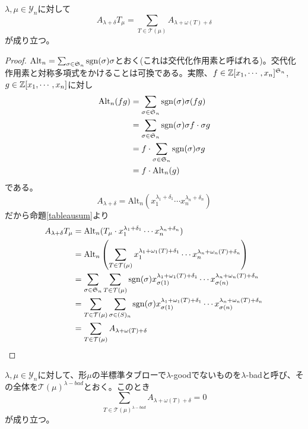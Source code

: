 \documentclass{ltjsreport}
\begin{document}
\begin{lemm}\label{equality}
    $\lambda,\mu\in\mathcal{Y}_n$に対して
    \[
    A_{\lambda+\delta}T_\mu=\sum_{T\in\mathcal{T}(\mu)}A_{\lambda+\omega(T)+\delta}
    \]
    が成り立つ。
\end{lemm}

\begin{proof}
    $\text{Alt}_n=\sum_{\sigma\in\mathfrak{S}_n}\mathrm{sgn}(\sigma)\sigma$とおく(これは交代化作用素と呼ばれる)。交代化作用素と対称多項式をかけることは可換である。実際、$f\in\mathbb{Z}[x_1,\cdots,x_n]^{\mathfrak{S}_n}$, $g\in\mathbb{Z}[x_1,\cdots,x_n]$に対し
    \begin{align*}
        \text{Alt}_n(fg)&=\sum_{\sigma\in\mathfrak{S}_n}\mathrm{sgn}(\sigma)\sigma(fg)\\
        &=\sum_{\sigma\in\mathfrak{S}_n}\mathrm{sgn}(\sigma)\sigma f\cdot \sigma g\\
        &=f\cdot\sum_{\sigma\in\mathfrak{S}_n}\mathrm{sgn}(\sigma)\sigma g\\
        &=f\cdot\text{Alt}_n(g)
    \end{align*}
    である。
    \[
    A_{\lambda+\delta}=\text{Alt}_n(x_1^{\lambda_1+\delta_1}\cdots x_n^{\lambda_n+\delta_n})
    \]
    だから命題\ref{tableausum}より
    \begin{align*}
        A_{\lambda+\delta}T_\mu&=\text{Alt}_n(T_\mu\cdot x_1^{\lambda_1+\delta_1}\cdots x_n^{\lambda_n+\delta_n})\\
        &=\text{Alt}_n\left(
            \sum_{T\in\mathcal{T}(\mu)}x_1^{\lambda_1+\omega_1(T)+\delta_1}\cdots x_n^{\lambda_n+\omega_n(T)+\delta_n}
        \right)\\
        &=\sum_{\sigma\in\mathfrak{S}_n}\sum_{T\in\mathcal{T}(\mu)}\mathrm{sgn}(\sigma)x_{\sigma(1)}^{\lambda_1+\omega_1(T)+\delta_1}\cdots x_{\sigma(n)}^{\lambda_n+\omega_n(T)+\delta_n}\\
        &=\sum_{T\in\mathcal{T}(\mu)}\sum_{\sigma\in\mathfrak(S)_n}\mathrm{sgn}(\sigma)x_{\sigma(1)}^{\lambda_1+\omega_1(T)+\delta_1}\cdots x_{\sigma(n)}^{\lambda_n+\omega_n(T)+\delta_n}\\
        &=\sum_{T\in\mathcal{T}(\mu)}A_{\lambda+\omega(T)+\delta}
    \end{align*}
\end{proof}

\begin{lemm}\label{cancellation}
    $\lambda,\mu\in\mathcal{Y}_n$に対して、形$\mu$の半標準タブローで$\lambda$-goodでないものを$\lambda$-badと呼び、その全体を$\mathcal{T}(\mu)^{\lambda-bad}$とおく。このとき
    \[
    \sum_{T\in\mathcal{T}(\mu)^{\lambda-bad}}A_{\lambda+\omega(T)+\delta}=0    
    \]
    が成り立つ。
\end{lemm}
\end{document}
